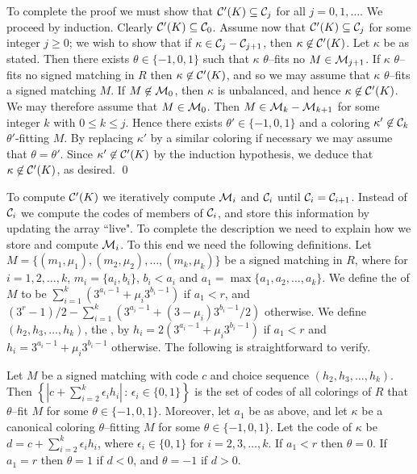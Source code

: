 To complete the proof we must show that ${\cal C}'(K)\subseteq{\cal C}_j$
for all $j=0,1,\ldots$. We proceed by induction. Clearly
${\cal C}'(K)\subseteq{\cal C}_0$. Assume now that ${\cal C}'(K)\subseteq
{\cal C}_j$ for some integer $j\ge 0$; we wish to show that 
if $\kappa\in{\cal C}_j-{\cal C}_{j+1}$, then $\kappa\not\in{\cal C}'(K)$.
Let $\kappa$ be as stated. Then there exists $\theta\in\{-1,0,1\}$
such that $\kappa$ $\theta$--fits no $M\in{\cal M}_{j+1}$.
If $\kappa$ $\theta$--fits no signed matching in $R$ then $\kappa\not\in
{\cal C}'(K)$, and so we may assume that $\kappa$ $\theta$--fits
a signed matching $M$. If $M\not\in{\cal M}_{0}$, then $\kappa$
is unbalanced, and hence $\kappa\not\in{\cal C}'(K)$. We may therefore
assume that $M\in{\cal M}_{0}$. Then $M\in {\cal M}_k-{\cal M}_{k+1}$
for some integer $k$ with $0\le k\le j$. Hence there exists
$\theta'\in\{-1,0,1\}$ and a coloring $\kappa'\not\in{\cal C}_k$
$\theta'$-fitting $M$. By replacing $\kappa'$ by a similar
coloring if necessary we may assume that $\theta=\theta'$.
Since $\kappa'\not\in{\cal C}'(K)$ by the induction hypothesis,
we deduce that $\kappa\not\in{\cal C}'(K)$, as desired. \qed

To compute ${\cal C}'(K)$ we iteratively compute ${\cal M}_i$ and
${\cal C}_i$ until ${\cal C}_i={\cal C}_{i+1}$. Instead of ${\cal C}_i$
we compute the codes of members of ${\cal C}_i$, and store this
information by updating the array ``live". To complete the
description we need to explain how we store and compute ${\cal M}_i$.
To this end we need the following definitions. Let
$M=\{(m_1,\mu_1),(m_2,\mu_2),\ldots,(m_k,\mu_k)\}$ be a signed
matching in $R$, where for $i=1,2,\ldots,k$, $m_i=\{a_i,b_i\}$,
$b_i<a_i$ and $a_1=\max\{a_1,a_2,\ldots,a_k\}$.
We define the  of $M$ to be
$\sum_{i=1}^k\left(3^{a_i-1}+\mu_i3^{b_i-1}\right)$ if $a_1<r$, and
$(3^r-1)/2-\sum_{i=1}^k\left(3^{a_i-1}+(3-\mu_i)3^{b_i-1}/2\right)$ 
otherwise. We define $(h_2,h_3,\ldots,h_k)$, the 
, by $h_i=2(3^{a_i-1}+\mu_i3^{b_i-1})$ if
$a_1<r$ and $h_i=3^{a_i-1}+\mu_i3^{b_i-1}$ otherwise. The following
is straightforward to verify.

Let $M$ be a signed matching with code $c$ and choice
sequence $(h_2,h_3,\ldots,h_k)$. Then 
$\left\{\left|c+\sum_{i=2}^k\epsilon_i h_i\right|\,:\,
\epsilon_i\in\{0,1\}\right\}$ is
the set of codes of all colorings of $R$ that $\theta$--fit
$M$ for some $\theta\in\{-1,0,1\}$. Moreover, let $a_1$ be as above,
and let $\kappa$ be a canonical coloring $\theta$--fitting $M$
for some $\theta\in\{-1,0,1\}$. Let the code of $\kappa$ be
$d=c+\sum_{i=2}^k\epsilon_i h_i$, where $\epsilon_i\in\{0,1\}$
for $i=2,3,\ldots,k$. If $a_1<r$ then $\theta=0$. If $a_1=r$ then
$\theta=1$ if $d<0$, and $\theta=-1$ if $d>0$.

